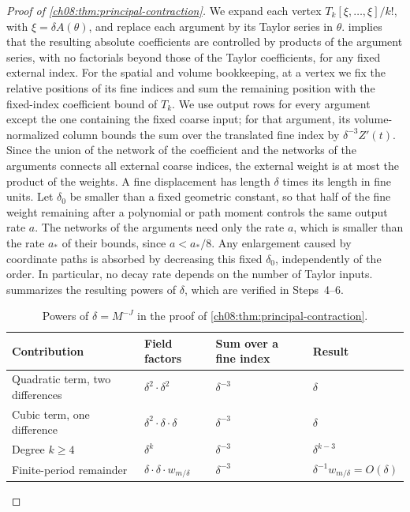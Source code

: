 \begin{proof}[Proof of \cref{ch08:thm:principal-contraction}]
We expand each vertex $T_k[\xi,\dots,\xi]/k!$, with $\xi=\delta A(\theta)$, and replace each argument by its Taylor series in $\theta$.  implies that the resulting absolute coefficients are controlled by products of the argument series, with no factorials beyond those of the Taylor coefficients, for any fixed external index. For the spatial and volume bookkeeping, at a vertex we fix the relative positions of its fine indices and sum the remaining position with the fixed-index coefficient bound of $T_k$. We use output rows for every argument except the one containing the fixed coarse input; for that argument, its volume-normalized column bounds the sum over the translated fine index by $\delta^{-3}Z'(t)$. Since the union of the network of the coefficient and the networks of the arguments connects all external coarse indices, the external weight is at most the product of the weights. A fine displacement has length $\delta$ times its length in fine units. Let $\delta_0$ be smaller than a fixed geometric constant, so that half of the fine weight remaining after a polynomial or path moment controls the same output rate $a$. The networks of the arguments need only the rate $a$, which is smaller than the rate $a_*$ of their bounds, since $a<a_*/8$. Any enlargement caused by coordinate paths is absorbed by decreasing this fixed $\delta_0$, independently of the order. In particular, no decay rate depends on the number of Taylor inputs.  summarizes the resulting powers of $\delta$, which are verified in Steps~4--6.

\begin{table}[ht]
\centering
\small
\begin{tabular}{@{}llll@{}}
\toprule
Contribution & Field factors & Sum over a fine index & Result\\
\midrule
Quadratic term, two differences & $\delta^2\cdot\delta^2$ & $\delta^{-3}$ & $\delta$\\
Cubic term, one difference & $\delta^2\cdot\delta\cdot\delta$ & $\delta^{-3}$ & $\delta$\\
Degree $k\ge4$ & $\delta^k$ & $\delta^{-3}$ & $\delta^{k-3}$\\
Finite-period remainder & $\delta\cdot\delta\cdot w_{m/\delta}$ & $\delta^{-3}$ & $\delta^{-1}w_{m/\delta}=O(\delta)$\\
\bottomrule
\end{tabular}
\caption{Powers of $\delta=M^{-J}$ in the proof of \cref{ch08:thm:principal-contraction}.}
\label{ch08:tab:powers}
\end{table}


\end{proof}

